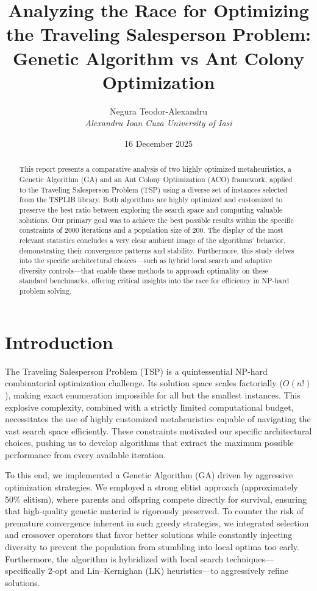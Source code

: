 \documentclass[11pt,a4paper]{article}
\title{Analyzing the Race for Optimizing the Traveling Salesperson Problem: Genetic Algorithm vs Ant Colony Optimization}
\author{Negura Teodor-Alexandru \\ \textit{Alexandru Ioan Cuza University of Iasi}}
\date{16 December 2025}
\begin{document}
\maketitle

\begin{abstract}
This report presents a comparative analysis of two highly optimized metaheuristics, a Genetic Algorithm (GA) and an Ant Colony Optimization (ACO) framework, applied to the Traveling Salesperson Problem (TSP) using a diverse set of instances selected from the TSPLIB library. Both algorithms are highly optimized and customized to preserve the best ratio between exploring the search space and computing valuable solutions. Our primary goal was to achieve the best possible results within the specific constraints of 2000 iterations and a population size of 200. The display of the most relevant statistics concludes a very clear ambient image of the algorithms' behavior, demonstrating their convergence patterns and stability. Furthermore, this study delves into the specific architectural choices---such as hybrid local search and adaptive diversity controls---that enable these methods to approach optimality on these standard benchmarks, offering critical insights into the race for efficiency in NP-hard problem solving.
\end{abstract}

\section{Introduction}
The Traveling Salesperson Problem (TSP) is a quintessential NP-hard combinatorial optimization challenge. Its solution space scales factorially ($O(n!)$), making exact enumeration impossible for all but the smallest instances. This explosive complexity, combined with a strictly limited computational budget, necessitates the use of highly customized metaheuristics capable of navigating the vast search space efficiently. These constraints motivated our specific architectural choices, pushing us to develop algorithms that extract the maximum possible performance from every available iteration.

To this end, we implemented a Genetic Algorithm (GA) driven by aggressive optimization strategies. We employed a strong elitist approach (approximately 50\% elitism), where parents and offspring compete directly for survival, ensuring that high-quality genetic material is rigorously preserved. To counter the risk of premature convergence inherent in such greedy strategies, we integrated selection and crossover operators that favor better solutions while constantly injecting diversity to prevent the population from stumbling into local optima too early. Furthermore, the algorithm is hybridized with local search techniques---specifically 2-opt and Lin--Kernighan (LK) heuristics---to aggressively refine solutions.
\end{document}
